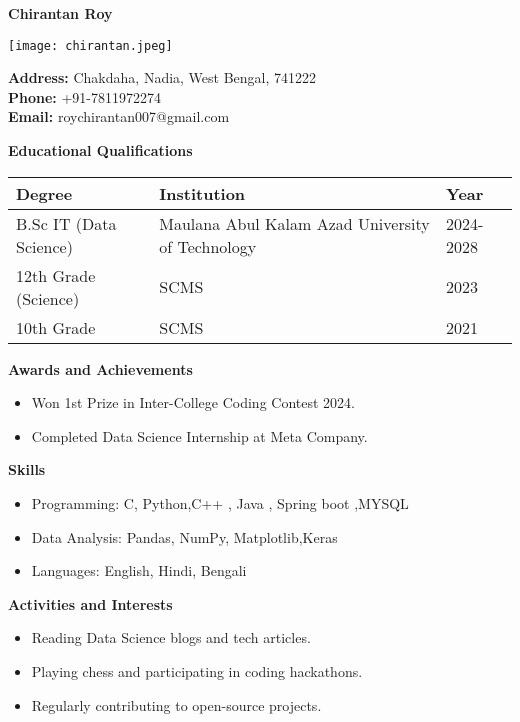 \documentclass[12pt]{article}
\begin{document}
\begin{flushleft}
    \Huge \textbf{Chirantan Roy}
\end{flushleft}

\begin{flushright}
    \texttt{[image: chirantan.jpeg]}
\end{flushright}

\noindent
\textbf{Address:} Chakdaha, Nadia, West Bengal, 741222 \\
\textbf{Phone:} +91-7811972274\\
\textbf{Email:} roychirantan007@gmail.com

\vspace{0.5cm}

\noindent
\textbf{\large Educational Qualifications}

\begin{tabular}{| m{5cm} | m{5cm} | m{3cm} |}
    \hline
    \textbf{Degree} & \textbf{Institution} & \textbf{Year} \\
    \hline
    B.Sc IT (Data Science) & Maulana Abul Kalam Azad University of Technology & 2024-2028 \\
    \hline
    12th Grade (Science) & SCMS & 2023 \\
    \hline
    10th Grade & SCMS& 2021 \\
    \hline
\end{tabular}

\vspace{0.5cm}

\noindent
\textbf{\large Awards and Achievements}
\begin{itemize}
    \item Won 1st Prize in Inter-College Coding Contest 2024.
    \item Completed Data Science Internship at Meta Company.
\end{itemize}

\noindent
\textbf{\large Skills}
\begin{itemize}
    \item Programming: C, Python,C++ , Java , Spring boot ,MYSQL
    \item Data Analysis: Pandas, NumPy, Matplotlib,Keras
    \item Languages: English, Hindi, Bengali
\end{itemize}

\noindent
\textbf{\large Activities and Interests}
\begin{itemize}
    \item Reading Data Science blogs and tech articles.
    \item Playing chess and participating in coding hackathons.
    \item Regularly contributing to open-source projects.
\end{itemize}
\end{document}
